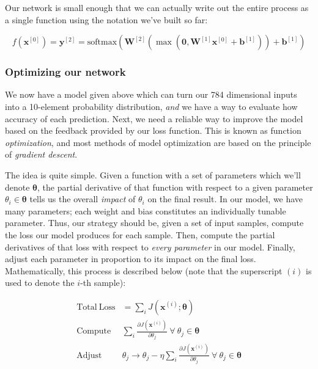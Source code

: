 \documentclass[
]{article}
\begin{document}
Our network is small enough that we can actually write out the entire
process as a single function using the notation we've built so far:

\[f(\mathbf{x}^{[0]}) = \mathbf{y}^{[2]} = \mathrm{softmax}\left(\mathbf{W}^{[2]}\left(\max\left(\mathbf{0}, \mathbf{W}^{[1]}\mathbf{x}^{[0]} + \mathbf{b}^{[1]}\right) \right) + \mathbf{b}^{[1]} \right)\]

\hypertarget{optimizing-our-network}{%
\subsubsection{Optimizing our network}\label{optimizing-our-network}}

We now have a model given above which can turn our 784 dimensional
inputs into a 10-element probability distribution, \emph{and} we have a
way to evaluate how accuracy of each prediction. Next, we need a
reliable way to improve the model based on the feedback provided by our
loss function. This is known as function \emph{optimization}, and most
methods of model optimization are based on the principle of
\emph{gradient descent}.

The idea is quite simple. Given a function with a set of parameters
which we'll denote \(\bm{\theta}\), the partial derivative of that
function with respect to a given parameter \(\theta_i \in \bm{\theta}\)
tells us the overall \emph{impact} of \(\theta_i\) on the final result.
In our model, we have many parameters; each weight and bias constitutes
an individually tunable parameter. Thus, our strategy should be, given a
set of input samples, compute the loss our model produces for each
sample. Then, compute the partial derivatives of that loss with respect
to \emph{every parameter} in our model. Finally, adjust each parameter
in proportion to its impact on the final loss. Mathematically, this
process is described below (note that the superscript \((i)\) is used to
denote the \(i\)-th sample):

\[
\begin{aligned}
\mathrm{Total~Loss} &= \sum_i J(\mathbf{x}^{(i)}; \bm\theta) \\
\mathrm{Compute}~ &\sum_i \frac{\partial J(\mathbf{x}^{(i)})}{\partial \theta_j} ~\forall ~\theta_j \in \bm\theta \\
\mathrm{Adjust}~ & \theta_j \rightarrow \theta_j - \eta \sum_i \frac{\partial J(\mathbf{x}^{(i)})}{\partial \theta_j} ~\forall ~\theta_j \in\bm\theta\\
\end{aligned}
\]
\end{document}
